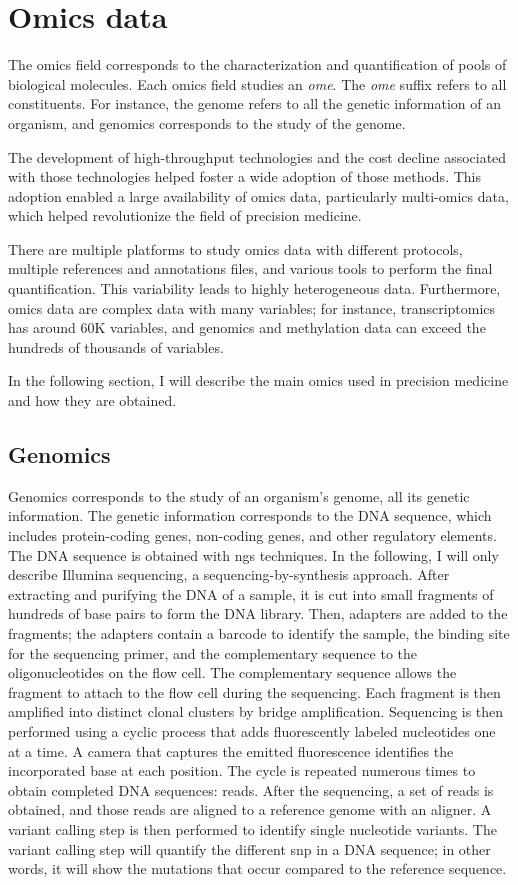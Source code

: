 \documentclass[../main.tex]{subfiles}
\begin{document}
\section{Omics data}
	The omics field corresponds to the characterization and quantification of pools of biological molecules.
	Each omics field studies an \textit{ome}.
	The \textit{ome} suffix refers to all constituents.
	For instance, the genome refers to all the genetic information of an organism, and genomics corresponds to the study of the genome.

	The development of high-throughput technologies and the cost decline associated with those technologies helped foster a wide adoption of those methods.
	This adoption enabled a large availability of omics data, particularly multi-omics data, which helped revolutionize the field of precision medicine.

	There are multiple platforms to study omics data with different protocols, multiple references and annotations files, and various tools to perform the final quantification.
	This variability leads to highly heterogeneous data.
	Furthermore, omics data are complex data with many variables; for instance, transcriptomics has around 60K variables, and genomics and methylation data can exceed the hundreds of thousands of variables.

	In the following section, I will describe the main omics used in precision medicine and how they are obtained.

	\subsection{Genomics}\label{subsec:genomics}
		Genomics corresponds to the study of an organism's genome, \ie{}all its genetic information.
		The genetic information corresponds to the DNA sequence, which includes protein-coding genes, non-coding genes, and other regulatory elements.
		The DNA sequence is obtained with \gls{ngs} techniques.
		In the following, I will only describe Illumina sequencing, a sequencing-by-synthesis approach.
		After extracting and purifying the DNA of a sample, it is cut into small fragments of hundreds of base pairs to form the DNA library.
		Then, adapters are added to the fragments; the adapters contain a barcode to identify the sample, the binding site for the sequencing primer, and the complementary sequence to the oligonucleotides on the flow cell.
		The complementary sequence allows the fragment to attach to the flow cell during the sequencing.
		Each fragment is then amplified into distinct clonal clusters by bridge amplification.
		Sequencing is then performed using a cyclic process that adds fluorescently labeled nucleotides one at a time.
		A camera that captures the emitted fluorescence identifies the incorporated base at each position.
		The cycle is repeated numerous times to obtain completed DNA sequences: reads.
		After the sequencing, a set of reads is obtained, and those reads are aligned to a reference genome with an aligner.
		A variant calling step is then performed to identify single nucleotide variants.
		The variant calling step will quantify the different \gls{snp} in a DNA sequence; in other words, it will show the mutations that occur compared to the reference sequence.
\end{document}
